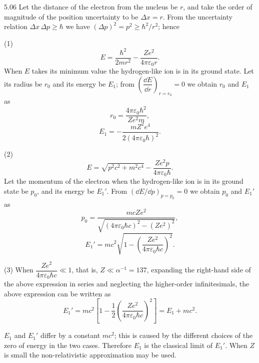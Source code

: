 \begin{solution}{5.06}
Let the distance of the electron from the nucleus be $r$, and take the order of magnitude of
the position uncertainty to be $\Delta x = r$. From the uncertainty relation
$\Delta x\,\Delta p \ge \hbar$ we have $(\Delta p)^2 = p^2 \ge \hbar^2/r^2$; hence

(1)
\begin{equation*}
E = \frac{\hbar^2}{2mr^2} - \frac{Ze^2}{4\pi\varepsilon_0r}.
\end{equation*}
When $E$ takes its minimum value the hydrogen-like ion is in its ground state. Let its radius
be $r_0$ and its energy be $E_1$; from $\left(\dfrac{\dd E}{\dd r}\right)_{r=r_0} = 0$ we obtain
$r_0$ and $E_1$ as
\begin{equation*}
r_0 = \frac{4\pi\varepsilon_0\hbar^2}{Ze^2m},
\end{equation*}
\begin{equation*}
E_1 = -\frac{mZ^2e^4}{2(4\pi\varepsilon_0\hbar)^2}.
\end{equation*}

(2)
\begin{equation*}
E = \sqrt{p^2c^2 + m^2c^4} - \frac{Ze^2p}{4\pi\varepsilon_0\hbar}.
\end{equation*}
Let the momentum of the electron when the hydrogen-like ion is in its ground state be $p_0$,
and its energy be $E_1'$. From $(\dd E/\dd p)_{p=p_0} = 0$ we obtain $p_0$ and $E_1'$ as
\begin{equation*}
p_0 = \frac{mcZe^2}{\sqrt{(4\pi\varepsilon_0\hbar c)^2 - (Ze^2)^2}},
\end{equation*}
\begin{equation*}
E_1' = mc^2\sqrt{1 - \left(\frac{Ze^2}{4\pi\varepsilon_0\hbar c}\right)^2}.
\end{equation*}

(3) When $\dfrac{Ze^2}{4\pi\varepsilon_0\hbar c} \ll 1$, that is, $Z \ll \alpha^{-1} = 137$,
expanding the right-hand side of the above expression in series and neglecting the
higher-order infinitesimals, the above expression can be written as
\begin{equation*}
E_1' = mc^2\left[1 - \frac{1}{2}\left(\frac{Ze^2}{4\pi\varepsilon_0\hbar c}\right)^2\right]
     = E_1 + mc^2.
\end{equation*}

$E_1$ and $E_1'$ differ by a constant $mc^2$; this is caused by the different choices of the
zero of energy in the two cases. Therefore $E_1$ is the classical limit of $E_1'$. When $Z$ is
small the non-relativistic approximation may be used.


\end{solution}
